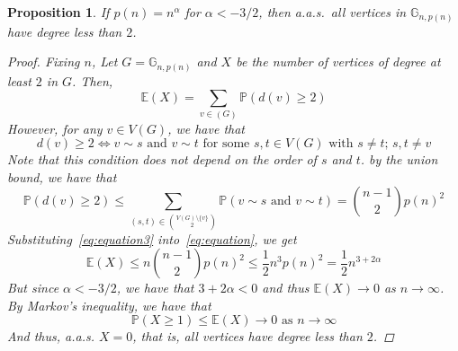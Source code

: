 \documentclass{amsart}
\theoremstyle{plain}
\newtheorem*{proposition}{\textbf{Proposition}}
\theoremstyle{definition}
\begin{document}
    \begin{proposition}
        If $p(n) = n^{\alpha}$ for $\alpha < -3/2$, then a.a.s.\
        all vertices in $\mathbb{G}_{n, p(n)}$ have degree less than $2$.

        \begin{proof}
            \vspace{-3mm}
            Fixing $n$, Let $G = \mathbb{G}_{n, p(n)}$ and $X$
            be the number of vertices of degree at least $2$ in $G$.
            Then,
            \begin{equation}
                \mathbb{E}(X) = \sum_{v\in(G)} \mathbb{P}(d(v) \geq 2)\label{eq:equation}
            \end{equation}
            However, for any $v \in V(G)$, we have that
            \begin{equation}
                d(v) \geq 2 \iff v \sim s \text{ and } v \sim t \text{ for some }
                s, t \in V(G) \text{ with } s \neq t; \, s, t \neq v
                \label{eq:equation2}
            \end{equation}
            Note that this condition does not depend on the order of $s$ and $t$.
            by the union bound, we have that
            \begin{equation}
                \mathbb{P}(d(v) \geq 2) \leq
                \sum_{(s, t) \in \binom{V(G) \setminus \{v\}}{2}} \mathbb{P}(v \sim s \text{ and } v \sim t) =
                \binom{n-1}{2} p(n)^2
                \label{eq:equation3}
            \end{equation}
            Substituting~\eqref{eq:equation3} into~\eqref{eq:equation}, we get
            \begin{equation}
                \mathbb{E}(X) \leq n \binom{n-1}{2} p(n)^2 \leq \frac{1}{2} n^3 p(n)^2 = \frac{1}{2} n^{3 + 2\alpha}
                \label{eq:equation4}
            \end{equation}
            But since $\alpha < -3/2$, we have that $3 + 2\alpha < 0$ and thus $\mathbb{E}(X) \to 0$ as $n \to \infty$.
            By Markov's inequality, we have that
            \begin{equation}
                \mathbb{P}(X \geq 1) \leq \mathbb{E}(X) \to 0 \text{ as } n \to \infty
                \label{eq:equation5}
            \end{equation}
            And thus, a.a.s. $X = 0$, that is, all vertices have degree less than $2$.
        \end{proof}
    \end{proposition}
\end{document}
